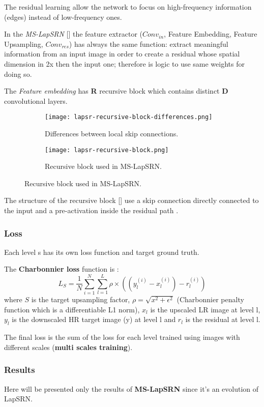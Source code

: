 The residual learning allow the network to focus on high-frequency information (edges) instead of low-frequency ones.

In the \textit{MS-LapSRN} [] the feature extractor ($Conv_{in}$, Feature Embedding, Feature Upsampling, $Conv_{res}$) has always the same function: extract meaningful information from an input image in order to create a residual whose spatial dimension in 2x then the input one; therefore is logic to use same weights for doing so.

The \textit{Feature embedding} has \textbf{R} recursive block \cite{DRCN} \cite{DRRN} which contains distinct \textbf{D} convolutional layers.

\begin{figure}
    \begin{subfigure}{0.49\textwidth}
        \centering
        \texttt{[image: lapsr-recursive-block-differences.png]}
        \caption{Differences between local skip connections.}            
    \end{subfigure}
    \begin{subfigure}{0.49\textwidth}
        \centering
        \texttt{[image: lapsr-recursive-block.png]}
        \caption{Recursive block used in MS-LapSRN.} \label{lapsrn:recursiveblock}
    \end{subfigure}
\end{figure}

The structure of the recursive block [] use a skip connection directly connected to the input and a pre-activation inside the residual path \cite{resnetidentity}.

\subsubsection{Loss}
Each level s has its own loss function and target ground truth.

The \textbf{Charbonnier loss} function is :
$$
L_S = \frac{1}{N} \sum_{i=1}^{N}\sum_{l=1}^{L} \rho \times \left( \left( y_l^{(i)}-x_l^{(i)} \right) - r_l^{(i)} \right)
$$
where $S$ is the target upsampling factor, $\rho = \sqrt{x^2+\epsilon^2}$ (Charbonnier penalty function which is a differentiable L1 norm), $x_l$ is the upscaled LR image at level l, $y_l$ is the downscaled HR target image (y) at level l and $r_l$ is the residual at level l. 

The final loss is the sum of the loss for each level trained using images with different scales (\textbf{multi scales training}).

\subsubsection{Results}

Here will be presented only the results of \textbf{MS-LapSRN}\cite{MSLapSRN} since it's an evolution of LapSRN.

